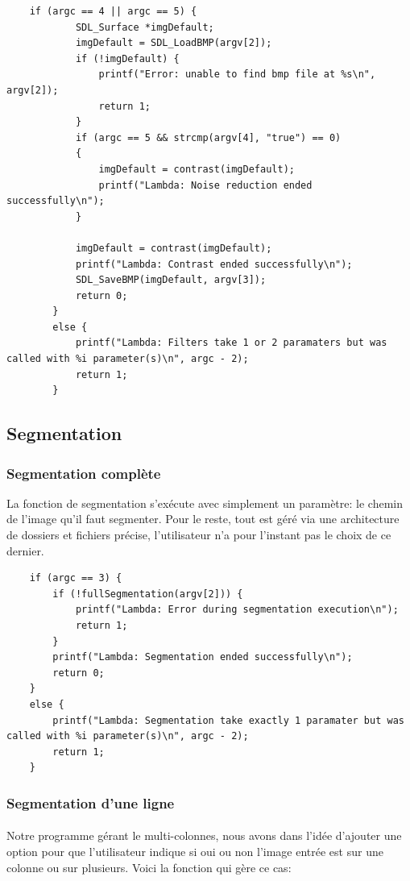 \documentclass{article}
\begin{document}
\begin{lstlisting}
	if (argc == 4 || argc == 5) {
			SDL_Surface *imgDefault;
			imgDefault = SDL_LoadBMP(argv[2]);
			if (!imgDefault) {
				printf("Error: unable to find bmp file at %s\n", argv[2]);
				return 1;
			}
			if (argc == 5 && strcmp(argv[4], "true") == 0)
			{
				imgDefault = contrast(imgDefault);
				printf("Lambda: Noise reduction ended successfully\n");
			}
			
			imgDefault = contrast(imgDefault);
			printf("Lambda: Contrast ended successfully\n");
			SDL_SaveBMP(imgDefault, argv[3]);
			return 0;
		}
		else {
			printf("Lambda: Filters take 1 or 2 paramaters but was called with %i parameter(s)\n", argc - 2);
			return 1;
		}
\end{lstlisting}

\subsection{Segmentation}

\subsubsection{Segmentation complète}
La fonction de segmentation s'exécute avec simplement un paramètre: le chemin de l'image qu'il faut segmenter. Pour le reste, tout est géré via une architecture de dossiers et fichiers précise, l'utilisateur n'a pour l'instant pas le choix de ce dernier.

\begin{lstlisting}
	if (argc == 3) {
		if (!fullSegmentation(argv[2])) {
			printf("Lambda: Error during segmentation execution\n");
			return 1;
		}
		printf("Lambda: Segmentation ended successfully\n");
		return 0;
	}
	else {
		printf("Lambda: Segmentation take exactly 1 paramater but was called with %i parameter(s)\n", argc - 2);
		return 1;
	}
\end{lstlisting}

\subsubsection{Segmentation d'une ligne}

\paragraph{}Notre programme gérant le multi-colonnes, nous avons dans l'idée d'ajouter une option pour que l'utilisateur indique si oui ou non l'image entrée est sur une colonne ou sur plusieurs. Voici la fonction qui gère ce cas:
\end{document}
